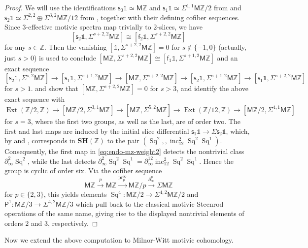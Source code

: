 \documentclass[11pt,hyp,english]{article}
\newcommand{\Z}{\mathbb{Z}}
\newcommand{\unit}{\mathds{1}}
\newcommand{\MZ}{\mathsf{M}\Z}
\newcommand{\SH}{\mathbf{SH}}
\newcommand{\Ext}{\operatorname{Ext}}
\newcommand{\Sq}{\operatorname{Sq}}
\newcommand{\pr}{\operatorname{pr}}
\newcommand{\inc}{\operatorname{inc}}
\newcommand{\s}{\mathsf{s}}
\newcommand{\f}{\mathsf{f}}
\let\iso=\cong
\theoremstyle{definition}
\begin{document}
\begin{proof}
We will use the identifications $\s_0\unit\simeq \MZ$ and $\s_1\unit\simeq \Sigma^{1,1}\MZ/2$ 
from  and 
$\s_2\unit\simeq \Sigma^{2,2}\oplus \Sigma^{3,2}\MZ/12$ from , 
together with their defining cofiber sequences.
Since $3$-effective motivic spectra map trivially to $2$-slices, 
we have 
$$
[\s_2\unit,\Sigma^{s+2,2}\MZ]
\cong 
[\f_2\unit,\Sigma^{s+2,2}\MZ]
$$ 
for any $s\in \Z$.
Then the vanishing $[\unit,\Sigma^{s+2,2}\MZ]=0$ for $s\notin \{-1,0\}$ (actually, just $s>0$) 
is used to conclude $[\MZ,\Sigma^{s+2,2}\MZ]\iso [\f_1\unit,\Sigma^{s+1,2}\MZ]$ and an exact sequence
\[ [\s_2\unit,\Sigma^{s,2}\MZ] \to [\s_1\unit,\Sigma^{s+1,2}\MZ] \to 
[\MZ,\Sigma^{s+2,2}\MZ] \to [\s_2\unit,\Sigma^{s+1,2}\MZ] \to [\s_1\unit,\Sigma^{s+2,2}\MZ] \]
for $s>1$.
 and  show that $[\MZ,\Sigma^{s+2,2}\MZ]=0$ for $s>3$, and identify the above exact sequence with
\begin{equation}\label{eq:endo-mz-weight2}
\Ext(\Z\! / 2,\Z) \to [\MZ/2,\Sigma^{3,1}\MZ] \to [\MZ,\Sigma^{5,2}\MZ]\to \Ext(\Z\! /\! 12,\Z)\to [\MZ/2,\Sigma^{4,1}\MZ] 
\end{equation}
for $s=3$, 
where the first two groups, as well as the last, are of order two.
The first and last maps are induced by the initial slice differential $\s_{1}\unit \to \Sigma\s_{2}\unit$, which, by  and \cite{zbMATH07003144}, corresponds in $\SH(\Z)$ to the pair $(\Sq^{2},, \inc^{2}_{12}\Sq^{2}\Sq^{1})$.
Consequently, the first map in \eqref{eq:endo-mz-weight2} detects the nontrivial class $\partial^{2}_{\infty}\Sq^{2}$, while the last detects $\partial^{2}_{\infty}\Sq^{2}\Sq^{1}=\partial^{12}_{\infty}\inc^{2}_{12}\Sq^{2}\Sq^{1}$.
Hence the group is cyclic of order six.
Via the cofiber sequence
\[ \MZ\xrightarrow{p}\MZ\xrightarrow{\pr^\infty_p}\MZ/p \xrightarrow{\partial^p_\infty} \Sigma\MZ\]
for $p\in \{2,3\}$, this yields elements
$\Sq^4\colon \MZ/2\to \Sigma^{4,2}\MZ/2$ and $\mathsf{P}^1\colon \MZ/3\to \Sigma^{4,2}\MZ/3$ 
which pull back to the classical motivic Steenrod operations of the same name, giving rise to the displayed nontrivial elements of orders $2$ and $3$, respectively.
\end{proof}

Now we extend the above computation to Milnor-Witt motivic cohomology.
\end{document}
